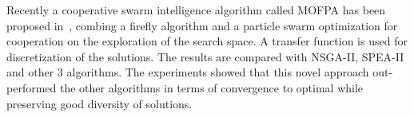 Recently a cooperative swarm intelligence algorithm called
MOFPA has been proposed in~\cite{zouache2018cooperative},
combing a firefly algorithm and a particle swarm
optimization for cooperation on the exploration of the search space.
A transfer function is used for discretization of the solutions.
The results are compared with NSGA-II, SPEA-II and other 3
algorithms.
The experiments showed that this novel approach 
out-performed the other algorithms in terms of convergence
to optimal while preserving good diversity of solutions.